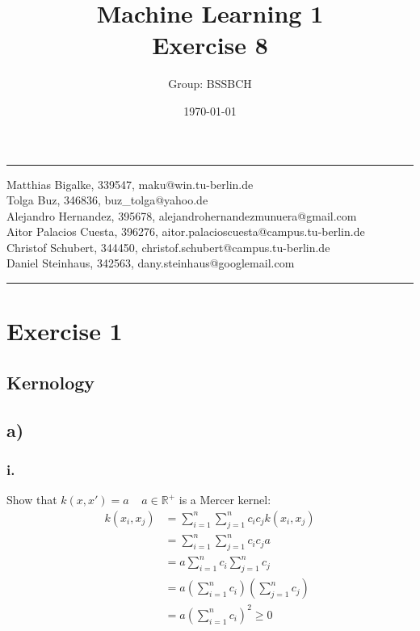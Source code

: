 \documentclass{article}
\title{Machine Learning 1 \\ Exercise 8} %
\author{Group: BSSBCH} %
\date{\today} %
\begin{document}
\maketitle %
\noindent\rule[0.5ex]{\linewidth}{1pt}
Matthias Bigalke, 339547, maku@win.tu-berlin.de \\
Tolga Buz, 346836, buz\_tolga@yahoo.de \\
Alejandro Hernandez, 395678, alejandrohernandezmunuera@gmail.com \\
Aitor Palacios Cuesta, 396276, aitor.palacioscuesta@campus.tu-berlin.de \\
Christof Schubert, 344450, christof.schubert@campus.tu-berlin.de \\
Daniel Steinhaus, 342563, dany.steinhaus@googlemail.com\\
\noindent\rule[0.5ex]{\linewidth}{1pt}


\section*{Exercise 1}

\subsection*{Kernology}

\subsection*{a)}

\subsubsection*{i.}

Show that
$k(x,x') = a \ \ \ \ \ a \in \mathbb{R}^+$ is a Mercer kernel:\\

\begin{align}
k(x_i,x_j) &= \sum_{i=1}^n \sum_{j=1}^n c_i c_j k(x_i,x_j) \\
&= \sum_{i=1}^n \sum_{j=1}^n c_i c_j a \\ 
&= a \sum_{i=1}^n c_i \sum_{j=1}^n c_j \\ 
&= a (\sum_{i=1}^n c_i) (\sum_{j=1}^n c_j) \\ 
&= a (\sum_{i=1}^n c_i)^2 \geq 0
\end{align}
\end{document}
